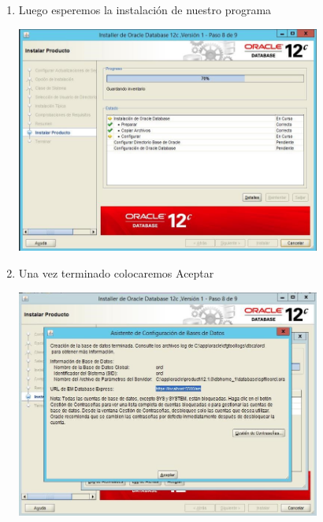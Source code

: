 \begin{enumerate}[1.]
	\hfill \break
	\hfill \break
	\hfill \break
	\hfill \break
	\hfill \break
	\hfill \break
	\hfill \break
	\hfill \break
	\item Luego esperemos la instalaci\'on de nuestro programa\\
	\begin{center}
	\includegraphics[width=10cm]{./Imagenes/img22} 
	\end{center}

	\item Una vez terminado colocaremos Aceptar\\
	\begin{center}
	\includegraphics[width=10cm]{./Imagenes/img23} 
	\end{center}


\end{enumerate}
